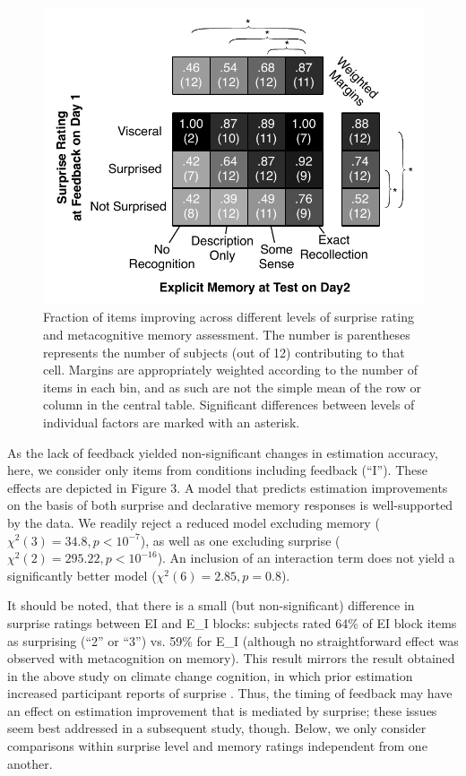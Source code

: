 \begin{figure}[h]
\centering
\includegraphics{shaded-table-reversals.pdf}
\caption{Fraction of items improving across different levels of surprise rating
and metacognitive memory assessment. The number is parentheses represents the
number of subjects (out of 12) contributing to that cell. Margins are
appropriately weighted according to the number of items in each bin, and as such
are not the simple mean of the row or column in the central table. Significant
differences between levels of individual factors are marked with an asterisk.}
\label{ei-table} 
\end{figure}

As the lack of feedback yielded non-significant changes in estimation accuracy,
here, we consider only items from conditions including feedback (``I''). These
effects are depicted in Figure 3.  A model that predicts estimation improvements
on the basis of both surprise and declarative memory responses is well-supported
by the data. We readily reject a reduced model excluding memory ($\chi^2(3) =
34.8, p < 10^{-7}$), as well as one excluding surprise ($\chi^2(2) = 295.22, p <
10^{-16}$). An inclusion of an interaction term does not yield a significantly
better model ($\chi^2(6) = 2.85, p = 0.8$). 

It should be noted, that there is a small (but non-significant)
difference in surprise ratings between EI and E\_I blocks: subjects rated 64\%
of EI block items as surprising (``2'' or ``3'') vs. 59\% for E\_I (although no
straightforward effect was observed with metacognition on memory).  This result
mirrors the result obtained in the above study on climate change cognition, in
which prior estimation increased participant reports of surprise
\cite[cf.][]{rinne_estimation_2006}.  Thus, the
timing of feedback may have an effect on estimation improvement that is mediated
by surprise; these issues seem best addressed in a subsequent study, though.
Below, we only consider comparisons within surprise level and memory ratings
independent from one another.

